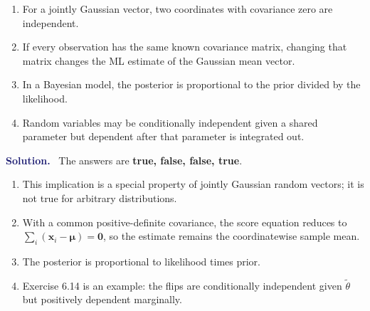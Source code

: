 \documentclass[11pt]{article}
\newcommand{\rv}[1]{\widetilde{#1}}
\newenvironment{answer}{%
    \par\medskip\noindent\textcolor{MidnightBlue}{\textbf{Solution.}}\ }
    {\par\medskip}
\newcommand{\workingspace}[1]{}
\newcommand{\workingspace}[1]{\vspace{#1}}
\begin{document}
\begin{enumerate}[label=(\alph*),itemsep=0.65em]
  \item For a jointly Gaussian vector, two coordinates with covariance zero
        are independent.
  \item If every observation has the same known covariance matrix, changing
        that matrix changes the ML estimate of the Gaussian mean vector.
  \item In a Bayesian model, the posterior is proportional to the prior divided
        by the likelihood.
  \item Random variables may be conditionally independent given a shared
        parameter but dependent after that parameter is integrated out.
\end{enumerate}
\workingspace{4.2cm}

\begin{answer}
The answers are \textbf{true, false, false, true}.
\begin{enumerate}[label=(\alph*),itemsep=0.35em]
  \item This implication is a special property of jointly Gaussian random
        vectors; it is not true for arbitrary distributions.
  \item With a common positive-definite covariance, the score equation reduces
        to $\sum_i(\bm{x}_i-\bm{\mu})=\bm{0}$, so the estimate remains the
        coordinatewise sample mean.
  \item The posterior is proportional to likelihood times prior.
  \item Exercise 6.14 is an example: the flips are conditionally independent
        given $\rv{\theta}$ but positively dependent marginally.
\end{enumerate}
\end{answer}
\end{document}
